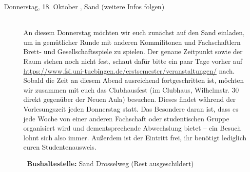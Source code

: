 \begin{description}
\item[Donnerstag, 18. Oktober \Jahr,  Sand (weitere Infos folgen)]\ \\
An diesem Donnerstag möchten wir euch zunächst auf den Sand einladen, um in gemütlicher Runde mit anderen Kommilitonen und Fachschaftlern Brett- und Gesellschaftsspiele zu spielen. Der genaue Zeitpunkt sowie der Raum stehen noch nicht fest, schaut dafür bitte ein paar Tage vorher auf \url{https://www.fsi.uni-tuebingen.de/erstsemester/veranstaltungen/} nach.\\ Sobald die Zeit an diesem Abend ausreichend fortgeschritten ist, möchten wir zusammen mit euch das Clubhausfest (im Clubhaus, Wilhelmstr. 30 direkt gegenüber der Neuen Aula) besuchen. Dieses findet während der Vorlesungszeit jeden Donnerstag statt. Das Besondere daran ist, dass es jede Woche von einer anderen Fachschaft oder studentischen Gruppe organisiert wird und dementsprechende Abwechslung bietet -- ein Besuch lohnt sich also immer. Außerdem ist der Eintritt frei, ihr benötigt lediglich euren Studentenausweis.

~\textbf{Bushaltestelle:} Sand Drosselweg (Rest ausgeschildert)

~\\
 
\end{description}
